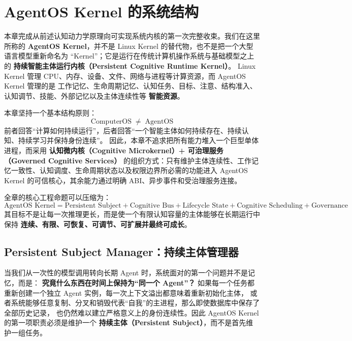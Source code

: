 \chapter{AgentOS Kernel 的系统结构}
\label{chap:agentos-kernel-architecture}

\begin{chapterlead}
本章完成从前述认知动力学原理向可实现系统内核的第一次完整收束。我们在这里所称的
\textbf{AgentOS Kernel}，并不是 Linux Kernel 的替代物，也不是把一个大型语言模型重新命名为
``Kernel''；它是运行在传统计算机操作系统与基础模型之上的
\textbf{持续智能主体运行内核（Persistent Cognitive Runtime Kernel）}。
Linux Kernel 管理 CPU、内存、设备、文件、网络与进程等计算资源，而 AgentOS Kernel 管理的是
工作记忆、生命周期记忆、认知任务、目标、注意、结构准入、认知调节、技能、外部记忆以及主体连续性等
\textbf{智能资源}。

本章坚持一个基本结构原则：
\[
\boxed{
\mathrm{ComputerOS}
\;\neq\;
\mathrm{AgentOS}
}
\]
前者回答``计算如何持续运行''，后者回答``一个智能主体如何持续存在、持续认知、持续学习并保持身份连续''。
因此，本章不追求把所有能力堆入一个巨型单体进程，而采用
\textbf{认知微内核（Cognitive Microkernel）+ 可治理服务（Governed Cognitive Services）}
的组织方式：只有维护主体连续性、工作记忆一致性、认知调度、生命周期状态以及权限边界所必需的功能进入
AgentOS Kernel 的可信核心，其余能力通过明确 ABI、异步事件和受治理服务连接。

全章的核心工程命题可以压缩为：
\[
\boxed{
\text{AgentOS Kernel}
=
\text{Persistent Subject}
+
\text{Cognitive Bus}
+
\text{Lifecycle State}
+
\text{Cognitive Scheduling}
+
\text{Governance}
}
\]
其目标不是让每一次推理更长，而是使一个有限认知容量的主体能够在长期运行中保持
\textbf{连续、有限、可恢复、可调节、可扩展并最终可成长}。
\end{chapterlead}


\section{Persistent Subject Manager：持续主体管理器}

当我们从一次性的模型调用转向长期 Agent 时，系统面对的第一个问题并不是记忆，而是：
\textbf{究竟什么东西在时间上保持为``同一个 Agent''？}
如果每一个任务都重新创建一个独立 Agent 实例，每一次上下文溢出都意味着重新初始化主体，
或者系统能够任意复制、分叉和销毁代表``自我''的主进程，那么即使数据库中保存了全部历史记录，
也仍然难以建立严格意义上的身份连续性。因此 AgentOS Kernel 的第一项职责必须是维护一个
\textbf{持续主体（Persistent Subject）}，而不是首先维护一组任务。

